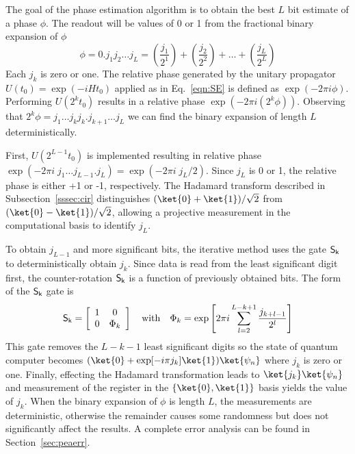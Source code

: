 \documentclass[11pt,oneside,final]{huthesis}%
\begin{document}
The goal of the phase estimation algorithm is to obtain the best $L$ bit estimate of a phase $\phi$.  The readout will be values of 0 or 1 from the fractional binary expansion of $\phi$
\begin{equation}
	\phi=0.j_1j_2\dots j_{L}=\left(\frac{j_1}{2^1}\right)+\left(\frac{j_2}{2^2}\right)+\dots+\left(\frac{j_{L}}{2^{L}}\right)
	\label{:Bin}
\end{equation}
Each $j_k$ is zero or one.  The relative phase generated by the unitary propagator $U(t_0)=\exp(-iHt_0)$ applied as in Eq.~\eqref{eqn:SE} is defined as $\exp(-2\pi i \phi)$.  Performing $U(2^kt_0)$ results in a relative phase $\exp(-2\pi i (2^k\phi))$.  Observing that $2^{k}\phi=j_1\dots j_{k}j_k.j_{k+1}\dots j_{L}$ we can find the binary expansion of length $L$ deterministically.

First, $U(2^{L-1}t_0)$ is implemented resulting in relative phase $\exp(-2\pi i \; j_1\dots j_{L-1}.j_L) = \exp(-2\pi i\; j_L/2)$.  Since $j_L$ is 0 or 1, the relative phase is either +1 or -1, respectively.  The Hadamard transform described in Subsection~\ref{sssec:cir} distinguishes $(\ket{0}+\ket{1})/\sqrt{2}$ from $(\ket{0}-\ket{1})/\sqrt{2}$, allowing a projective measurement in the computational basis to identify $j_L$.

To obtain $j_{L-1}$ and more significant bits, the iterative method uses the gate $\sf S_k$ to deterministically obtain $j_k$.  Since data is read from the least significant digit first, the counter-rotation $\sf S_k$ is a function of previously obtained bits. The form of the $\sf S_k$ gate is
\begin{equation}
{\sf S_k}=
\left[\begin{array}{cc}
	1&0\\
	0&\Phi_k
\end{array}\right]
\quad\mathrm{with}\quad
\Phi_k=\exp\left[2\pi i\sum_{l=2}^{L-k+1}\frac{j_{k+l-1}}{2^{l}}\right]
\label{eq:sgate}
\end{equation}
This gate removes the $L-k-1$ least significant digits so the state of quantum computer becomes $(\ket{0}+\exp[-i\pi j_k]\ket{1})\ket{\psi_n}$ where $j_k$ is zero or one.  Finally, effecting the Hadamard transformation leads to $\ket{j_k}\ket{\psi_n}$ and measurement of the register in the $\{\ket{0},\ket{1}\}$ basis yields the value of $j_k$.  When the binary expansion of $\phi$ is length $L$, the measurements are deterministic, otherwise the remainder causes some randomness but does not significantly affect the results.  A complete error analysis can be found in Section~\ref{sec:peaerr}. %
\end{document}
